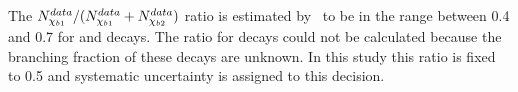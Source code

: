 The $N_{\chi_{{b} 1}}^{data}/(N_{\chi_{{b} 1}}^{data} + N_{\chi_{{b} 2}}^{data})$ ratio is
estimated by~ to be in the range between 0.4 and 0.7 for
\chibOneP and \chibTwoP decays. The ratio for \chibThreeP decays could not be
calculated because the branching fraction of these decays are unknown. In this
study this ratio is fixed to 0.5 and systematic uncertainty is assigned to this
decision. 

% 
